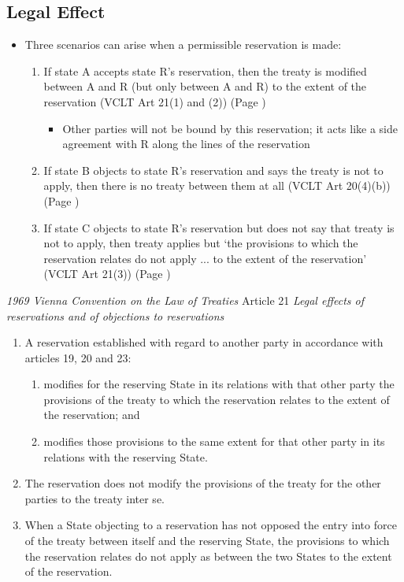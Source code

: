 \subsection{Legal Effect}
\begin{itemize}
    \item Three scenarios can arise when a permissible reservation is made:
    \begin{enumerate}
        \item If state A accepts state R's reservation, then the treaty is modified between A and R (but only between A and R) to the extent of the reservation (VCLT Art 21(1) and (2)) (Page \pageref{VCLT Art 21})
        \begin{itemize}
            \item Other parties will not be bound by this reservation; it acts like a side agreement with R along the lines of the reservation
        \end{itemize}
        \item If state B objects to state R's reservation and says the treaty is not to apply, then there is no treaty between them at all (VCLT Art 20(4)(b)) (Page \pageref{VCLT Art 20})
        \item If state C objects to state R's reservation but does not say that treaty is not to apply, then treaty applies but `the provisions to which the reservation relates do not apply ... to the extent of the reservation' (VCLT Art 21(3)) (Page \pageref{VCLT Art 21})
        
    \end{enumerate}
\end{itemize}
\begin{conventiondetails}{\textit{1969 Vienna Convention on the Law of Treaties} Article 21}\label{VCLT Art 21}
    \flushleft
    \textit{Legal effects of reservations and of objections to reservations}

    \begin{enumerate}
        \item  A reservation established with regard to another party in accordance with articles 19, 20 and 23:
        \begin{enumerate}[label=(\alph*)]
            \item modifies for the reserving State in its relations with that other party the provisions of the treaty to which the reservation relates to the extent of the reservation; and 
            \item modifies those provisions to the same extent for that other party in its relations with the reserving State.
        \end{enumerate}     
        \item The reservation does not modify the provisions of the treaty for the other parties to the treaty inter se. 
        \item When a State objecting to a reservation has not opposed the entry into force of the treaty between itself and the reserving State, the provisions to which the reservation relates do not apply as between the two States to the extent of the reservation.
    \end{enumerate}
\end{conventiondetails}

